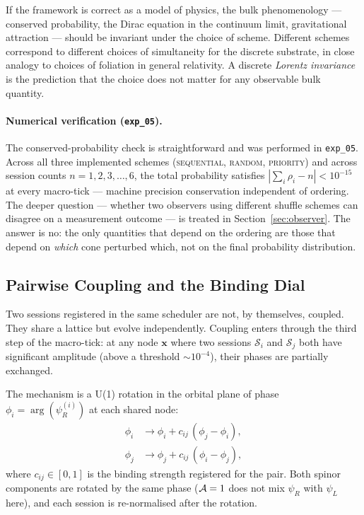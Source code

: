 If the framework is correct as a model of physics, the bulk
phenomenology --- conserved probability, the Dirac equation in the
continuum limit, gravitational attraction --- should be invariant under
the choice of scheme.
Different schemes correspond to different choices of simultaneity for the
discrete substrate, in close analogy to choices of foliation in general
relativity.
A discrete \emph{Lorentz invariance} is the prediction that the
choice does not matter for any observable bulk quantity.

\paragraph{Numerical verification (\texttt{exp\_05}).}
The conserved-probability check is straightforward and was performed in
\texttt{exp\_05}.
Across all three implemented schemes
(\textsc{sequential}, \textsc{random}, \textsc{priority}) and across
session counts $n = 1, 2, 3, \ldots, 6$, the total probability satisfies
$|\sum_i \rho_i - n| < 10^{-15}$ at every macro-tick --- machine precision
conservation independent of ordering.
The deeper question --- whether two observers using different shuffle
schemes can disagree on a measurement outcome --- is treated in
Section~\ref{sec:observer}.
The answer is no: the only quantities that depend on the ordering are
those that depend on \emph{which} cone perturbed which, not on the
final probability distribution.

\subsection{Pairwise Coupling and the Binding Dial}
\label{subsec:binding}

Two sessions registered in the same scheduler are not, by themselves,
coupled.
They share a lattice but evolve independently.
Coupling enters through the third step of the macro-tick: at any node
$\mathbf{x}$ where two sessions $\mathcal{S}_i$ and $\mathcal{S}_j$ both
have significant amplitude (above a threshold $\sim 10^{-4}$), their
phases are partially exchanged.

The mechanism is a U(1) rotation in the orbital plane of phase
$\phi_i = \arg(\psi_R^{(i)})$ at each shared node:
\begin{align}
    \phi_i &\to \phi_i + c_{ij}\,(\phi_j - \phi_i), \\
    \phi_j &\to \phi_j + c_{ij}\,(\phi_i - \phi_j),
    \label{eq:phase_mix}
\end{align}
where $c_{ij} \in [0, 1]$ is the binding strength registered for the
pair.
Both spinor components are rotated by the same phase
($\mathcal{A}=1$ does not mix $\psi_R$ with $\psi_L$ here), and each session is
re-normalised after the rotation.

